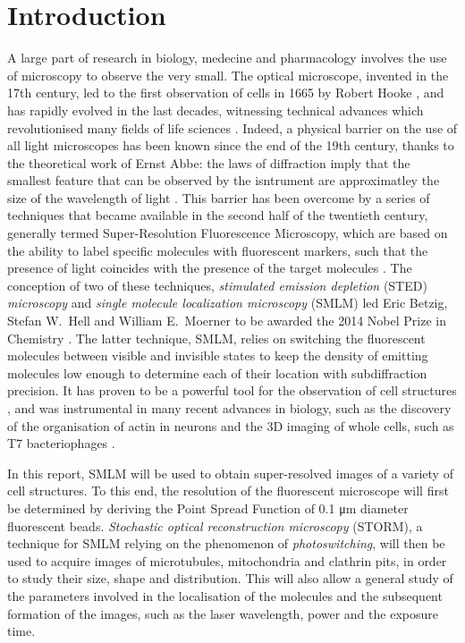 \section{Introduction}
A large part of research in biology, medecine and pharmacology involves the use of microscopy to observe the very small.
The optical microscope, invented in the 17th century, led to the first observation of cells in 1665 by Robert Hooke \cite{reigoto_comparative_2021}, and has rapidly evolved in the last decades, witnessing technical advances which revolutionised many fields of life sciences \cite{balasubramanian_imagining_2023}.
Indeed, a physical barrier on the use of all light microscopes has been known since the end of the 19th century, thanks to the theoretical work of Ernst Abbe: the laws of diffraction imply that the smallest feature that can be observed by the isntrument are approximatley the size of the wavelength of light \cite{diaspro_fundamentals_2011}.
This barrier has been overcome by a series of techniques that became available in the second half of the twentieth century, generally termed Super-Resolution Fluorescence Microscopy, which are based on the ability to label specific molecules with fluorescent markers, such that the presence of light coincides with the presence of the target molecules \cite{douglass_notice_2023}.
The conception of two of these techniques, \emph{stimulated emission depletion} (STED) \emph{microscopy} and \emph{single molecule localization microscopy} (SMLM) led Eric Betzig, Stefan W.~Hell and William E.~Moerner to be awarded the 2014 Nobel Prize in Chemistry \cite{nobel_press_2014}.
The latter technique, SMLM, relies on switching the fluorescent molecules between visible and invisible states to keep the density of emitting molecules low enough to determine each of their location with subdiffraction precision.
It has proven to be a powerful tool for the observation of cell structures \cite{baddeley_biological_2018}, 
and was instrumental in many recent advances in biology, such as the discovery of the organisation of actin in neurons \cite{xu_actin_2013} and the 3D imaging of whole cells, such as T7 bacteriophages \cite{huang_ultra-high_2016}.

In this report, SMLM will be used to obtain super-resolved images of a variety of cell structures.
To this end, the resolution of the fluorescent microscope will first be determined by deriving the Point Spread Function of 0.1 \unit{\micro m} diameter fluorescent beads.
\emph{Stochastic optical reconstruction microscopy} (STORM), a technique for SMLM relying on the phenomenon of \emph{photoswitching}, will then be used to acquire images of microtubules, mitochondria and clathrin pits, in order to study their size, shape and distribution.
This will also allow a general study of the parameters involved in the localisation of the molecules and the subsequent formation of the images, such as the laser wavelength, power and the exposure time.
